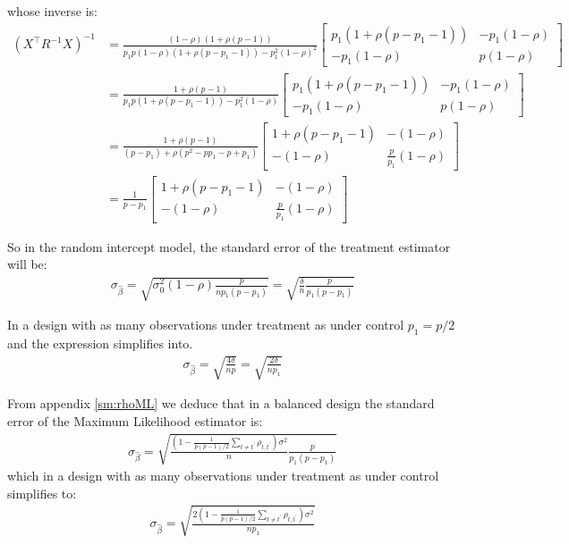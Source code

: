 \documentclass[12pt]{article}
\newcommand\trans[1]{{#1}^\intercal}%
\begin{document}
whose inverse is:
\begin{align*}
\left(\trans{X} R^{-1} X\right)^{-1} &= \frac{(1-\rho)(1+\rho(p-1))}{p_1 p (1-\rho)(1+\rho (p-p_1-1)) - p^2_1(1-\rho)^2} \begin{bmatrix} p_1(1+\rho (p-p_1-1))
                  & -p_1(1-\rho)
                  \\ -p_1(1-\rho)
                  & p(1-\rho)
\end{bmatrix} \\
&= \frac{1+\rho(p-1)}{p_1 p (1+\rho (p-p_1-1)) - p^2_1(1-\rho)} \begin{bmatrix} p_1(1+\rho (p-p_1-1))
                  & -p_1(1-\rho)
                  \\ -p_1(1-\rho)
                  & p(1-\rho)
\end{bmatrix} \\
&= \frac{1+\rho(p-1)}{(p - p_1) + \rho (p^2-p p_1-p+p_1)} \begin{bmatrix} 1+\rho (p-p_1-1)
                  & -(1-\rho)
                  \\ -(1-\rho)
                  & \frac{p}{p_1}(1-\rho)
\end{bmatrix} \\
&= \frac{1}{p-p_1} \begin{bmatrix} 1+\rho (p-p_1-1)
                  & -(1-\rho)
                  \\ -(1-\rho)
                  & \frac{p}{p_1}(1-\rho)
\end{bmatrix}   
\end{align*}

So in the random intercept model, the standard error of the treatment
estimator will be:
\begin{align*}
\sigma_{\widehat{\beta}} = \sqrt{\sigma_0^2(1-\rho) \frac{p}{n p_1(p-p_1)}}=\sqrt{\frac{\delta}{n} \frac{p}{p_1(p-p_1)}}
\end{align*}

In a design with as many observations under treatment as under control \(p_1=p/2\) and the expression simplifies into.
\begin{align*}
\sigma_{\widehat{\beta}} = \sqrt{\frac{4\delta}{np}} = \sqrt{\frac{2\delta}{np_1}}
\end{align*}

From appendix \ref{sm:rhoML} we deduce that in a balanced design the
standard error of the Maximum Likelihood estimator is:
\begin{align*}
\sigma_{\widehat{\beta}} = \sqrt{\frac{\left(1-\frac{1}{p(p-1)/2}\sum_{t \neq t^{\prime}} \rho_{t,t^{\prime}}\right) \sigma^2}{n}\frac{p}{p_1(p-p_1)}}
\end{align*}
which in a design with as many observations under treatment as under control simplifies to:
\begin{align*}
\sigma_{\widehat{\beta}} = \sqrt{\frac{2\left(1-\frac{1}{p(p-1)/2}\sum_{t \neq t^{\prime}} \rho_{t,t^{\prime}}\right) \sigma^2}{n p_1}}
\end{align*}


\clearpage
\end{document}
